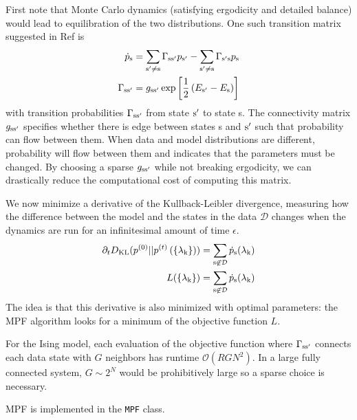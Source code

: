 \documentclass[aps,prl,twocolumn,nofootinbib]{revtex4-1}
\begin{document}
First note that Monte Carlo dynamics (satisfying ergodicity and detailed balance) would lead to equilibration of the two distributions. One such transition matrix suggested in Ref \cite{SohlDickstein:2011im} is
\begin{align}
	\dot{p}_{\rm s} &= \sum_{\rm s'\neq s} \Gamma_{\rm ss'} p_{\rm s'} -\sum_{\rm s'\neq s} \Gamma_{\rm s's} p_{\rm s}\\
	\Gamma_{\rm ss'} &= g_{\rm ss'}\exp\left[ \frac{1}{2}\left( E_{\rm s'}-E_{\rm s} \right) \right]
\end{align}
with transition probabilities $\Gamma_{\rm ss'}$ from state ${\rm s'}$ to state s. The connectivity matrix $g_{\rm ss'}$ specifies whether there is edge between states s and ${\rm s'}$ such that probability can flow between them. When data and model distributions are different, probability will flow between them and indicates that the parameters must be changed.
 By choosing a sparse $g_{\rm ss'}$ while not breaking ergodicity, we can drastically reduce the computational cost of computing this matrix.

We now minimize a derivative of the Kullback-Leibler divergence, measuring how the difference between the model and the states in the data $\mathcal{D}$ changes when the dynamics are run for an infinitesimal amount of time $\epsilon$.
\begin{align}
	\partial_t D_{\rm KL}(p^{(0)}||p^{(t)}\left(\{\lambda_{\rm k}\}\right)) &= \sum_{\rm s \not\in \mathcal{D}} \dot{p}_{\rm s}(\lambda_{\rm k})\\
	L(\{\lambda_{\rm k}\}) &= \sum_{\rm s \not\in \mathcal{D}} \dot{p}_{\rm s}(\lambda_{\rm k})
\end{align}
The idea is that this derivative is also minimized with optimal parameters: the MPF algorithm looks for a minimum of the objective function $L$.


For the Ising model, each evaluation of the objective function where $\Gamma_{\rm s s'}$ connects each data state with $G$ neighbors has runtime $\mathcal{O}(RGN^2)$. In a large fully connected system, $G\sim 2^N$ would be prohibitively large so a sparse choice is necessary.

MPF is implemented in the {\tt MPF} class.
\end{document}
